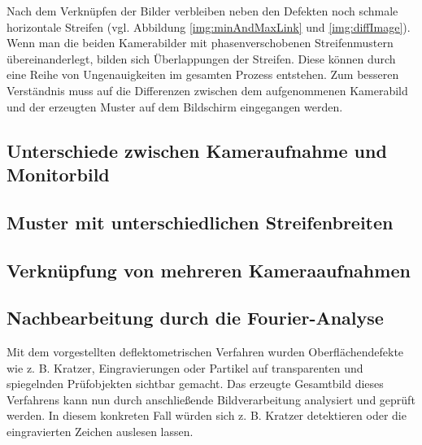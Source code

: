 Nach dem Verknüpfen der Bilder verbleiben neben den Defekten noch schmale horizontale Streifen (vgl. Abbildung \ref{img:minAndMaxLink} und \ref{img:diffImage}).
Wenn man die beiden Kamerabilder mit phasenverschobenen Streifenmustern übereinanderlegt, bilden sich Überlappungen der Streifen.
Diese können durch eine Reihe von Ungenauigkeiten im gesamten Prozess entstehen.
Zum besseren Verständnis muss auf die Differenzen zwischen dem aufgenommenen Kamerabild und der erzeugten Muster auf dem Bildschirm eingegangen werden.

{
	\FloatBarrier
    \subsection{Unterschiede zwischen Kameraufnahme und Monitorbild}
    \label{sub:unterschiedeKameraUndMonitor}
    
}

{
	\FloatBarrier
    \subsection{Muster mit unterschiedlichen Streifenbreiten}
    \label{sub:musterUnterschiedlichenStreifenbreiten}
    
}

{
	\FloatBarrier
    \subsection{Verknüpfung von mehreren Kameraaufnahmen}
    \label{sub:verknuepfungMehrererKameraaufnahmen}
    
}

{
	\FloatBarrier
    \subsection{Nachbearbeitung durch die Fourier-Analyse}
    \label{sub:nachbearbeitungFourierAnalyse}
    
}

\noindent
Mit dem vorgestellten deflektometrischen Verfahren wurden Oberflächen\-de\-fekte wie z. B. Kratzer, Eingravierungen oder Partikel auf transparenten und spiegelnden Prüfobjekten sichtbar gemacht.
Das erzeugte Gesamtbild dieses Verfahrens kann nun durch anschließende Bildverarbeitung analysiert und geprüft werden.
In diesem konkreten Fall würden sich z. B. Kratzer detektieren oder die eingravierten Zeichen auslesen lassen.

